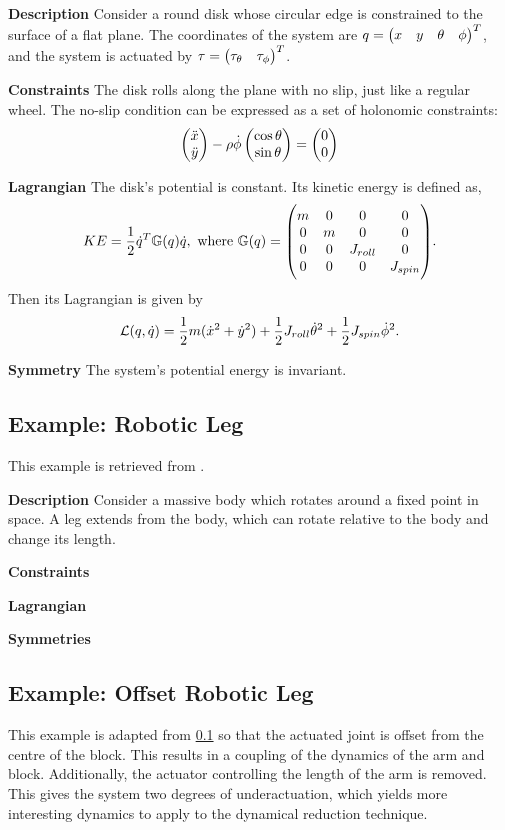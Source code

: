 \documentclass[main.tex]{subfiles}
\begin{document}
\textbf{Description} Consider a round disk whose circular edge is constrained to the surface of a flat plane. The coordinates of the system are $q=\pmqty{x&y&\theta&\phi}^T$, and the system is actuated by $\tau=\pmqty{\tau_\theta&\tau_\phi}^T$.

\textbf{Constraints} The disk rolls along the plane with no slip, just like a regular wheel. The no-slip condition can be expressed as a set of holonomic constraints:
\begin{align}
    \pmqty{\ddot{x}\\\ddot{y}}-\rho\dot{\phi}\pmqty{\cos\theta\\\sin\theta}=\pmqty{\zmat{2}{1}}
\end{align}

\textbf{Lagrangian} The disk's potential is constant. Its kinetic energy is defined as,
\begin{align}
    KE = \frac{1}{2}\dot q^T \mathbb{G}(q) \dot q, \textrm{ where  }\mathbb{G}(q)=
\mqty(\dmat[0]{m,m,J_{roll},J_{spin}}).
\end{align}
Then its Lagrangian is given by
\begin{align}
    \mathcal{L}(q,\dot q)=\frac{1}{2}m(\dot x^2+\dot y^2)+\frac{1}{2}J_{roll}\dot\theta^2+\frac{1}{2}J_{spin}\dot{\phi}^2.
\end{align}

\textbf{Symmetry} The system's potential energy is invariant.

\subsection{Example: Robotic Leg}\label{sec:robotarm}
This example is retrieved from \cite[293]{bullo2019geometric}.%

\textbf{Description} Consider a massive body which rotates around a fixed point in space. A leg extends from the body, which can rotate relative to the body and change its length.

\textbf{Constraints}

\textbf{Lagrangian}

\textbf{Symmetries}

\subsection{Example: Offset Robotic Leg}\label{sec:robotarmoffset} 
This example is adapted from \ref{sec:robotarm}  so that the actuated joint is offset from the centre of the block. This results in a coupling of the dynamics of the arm and block. Additionally, the actuator controlling the length of the arm is removed. This gives the system two degrees of underactuation, which yields more interesting dynamics to apply to the dynamical reduction technique.
\end{document}
